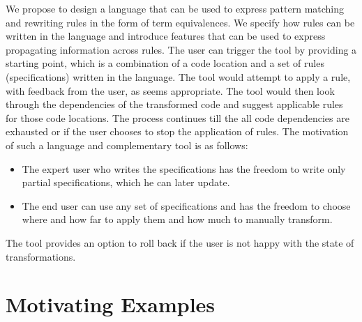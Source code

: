 \documentclass[preprint]{sigplanconf}
\begin{document}
              We propose to design a language that can be used to express pattern matching and rewriting rules in the form of term equivalences. We specify how rules can be written in the language and introduce features that can be used to express propagating information across rules. The user can trigger the tool by providing a starting point, which is a combination of a code location and a set of rules (specifications) written in the language. The tool would attempt to apply a rule, with feedback from the user, as seems appropriate. The tool would then look through the dependencies of the transformed code and suggest applicable rules for those code locations. The process continues till the all code dependencies are exhausted or if the user chooses to stop the application of rules. The motivation of such a language and complementary tool is as follows:
\begin{itemize}
\item The expert user who writes the specifications has the freedom to write only partial specifications, which he can later update.
\item The end user can use any set of specifications and has the freedom to choose where and how far to apply them and how much to manually transform.
\end{itemize}
The tool provides an option to roll back if the user is not happy with the state of transformations.

\section{Motivating Examples}
\end{document}
